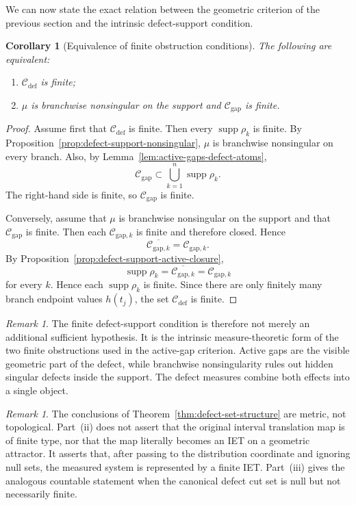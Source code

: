 \documentclass[11pt]{amsart}
\theoremstyle{plain}
\newtheorem{corollary}[theorem]{Corollary}
\theoremstyle{definition}
\theoremstyle{remark}
\newtheorem{remark}[theorem]{Remark}
\DeclareMathOperator{\supp}{supp}
\newcommand{\cC}{\mathcal C}
\begin{document}
We can now state the exact relation between the geometric criterion of the previous section
and the intrinsic defect-support condition.

\begin{corollary}[Equivalence of finite obstruction conditions]\label{cor:finite-obstruction-equivalence}
The following are equivalent:
\begin{enumerate}[label=\textup{(\roman*)}]
    \item \(\cC_{\mathrm{def}}\) is finite;
    \item \(\mu\) is branchwise nonsingular on the support and \(\cC_{\mathrm{gap}}\) is finite.
\end{enumerate}
\end{corollary}

\begin{proof}
Assume first that \(\cC_{\mathrm{def}}\) is finite. Then every \(\supp\rho_k\) is finite.
By Proposition~\ref{prop:defect-support-nonsingular}, \(\mu\) is branchwise nonsingular
on every branch. Also, by Lemma~\ref{lem:active-gaps-defect-atoms},
\[
        \cC_{\mathrm{gap}}
        \subset
        \bigcup_{k=1}^n \supp\rho_k.
\]
The right-hand side is finite, so \(\cC_{\mathrm{gap}}\) is finite.

Conversely, assume that \(\mu\) is branchwise nonsingular on the support and that
\(\cC_{\mathrm{gap}}\) is finite. Then each \(\cC_{\mathrm{gap},k}\) is finite and
therefore closed. Hence
\[
        \overline{\cC_{\mathrm{gap},k}}=\cC_{\mathrm{gap},k}.
\]
By Proposition~\ref{prop:defect-support-active-closure},
\[
        \supp\rho_k
        =\overline{\cC_{\mathrm{gap},k}}
        =\cC_{\mathrm{gap},k}
\]
for every \(k\). Hence each \(\supp\rho_k\) is finite. Since there are only finitely many
branch endpoint values \(h(t_j)\), the set \(\cC_{\mathrm{def}}\) is finite.
\end{proof}

\begin{remark}
The finite defect-support condition is therefore not merely an additional sufficient
hypothesis. It is the intrinsic measure-theoretic form of the two finite obstructions used
in the active-gap criterion. Active gaps are the visible geometric part of the defect, while
branchwise nonsingularity rules out hidden singular defects inside the support. The defect
measures combine both effects into a single object.
\end{remark}

\begin{remark}
The conclusions of Theorem~\ref{thm:defect-set-structure} are metric, not topological.
Part~\textup{(ii)} does not assert that the original interval translation map is of finite
type, nor that the map literally becomes an IET on a geometric attractor.
It asserts that, after passing to the distribution coordinate and ignoring null sets, the
measured system is represented by a finite IET. Part~\textup{(iii)} gives
the analogous countable statement when the canonical defect cut set is null but not necessarily
finite.
\end{remark}
\end{document}
